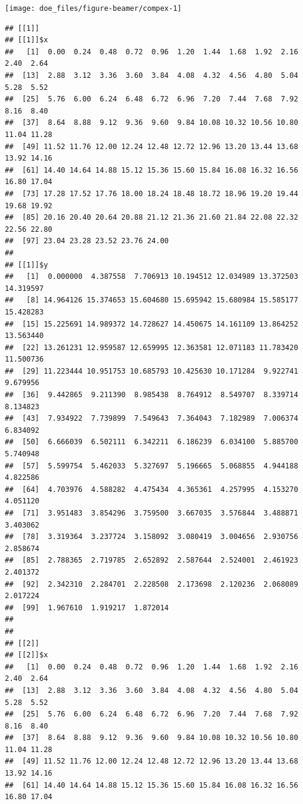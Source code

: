 \documentclass[
  ignorenonframetext,
]{beamer}
\begin{document}
\begin{frame}[fragile]{}
\begin{center}\texttt{[image: doe\_files/figure-beamer/compex-1]} \end{center}

\begin{verbatim}
## [[1]]
## [[1]]$x
##   [1]  0.00  0.24  0.48  0.72  0.96  1.20  1.44  1.68  1.92  2.16  2.40  2.64
##  [13]  2.88  3.12  3.36  3.60  3.84  4.08  4.32  4.56  4.80  5.04  5.28  5.52
##  [25]  5.76  6.00  6.24  6.48  6.72  6.96  7.20  7.44  7.68  7.92  8.16  8.40
##  [37]  8.64  8.88  9.12  9.36  9.60  9.84 10.08 10.32 10.56 10.80 11.04 11.28
##  [49] 11.52 11.76 12.00 12.24 12.48 12.72 12.96 13.20 13.44 13.68 13.92 14.16
##  [61] 14.40 14.64 14.88 15.12 15.36 15.60 15.84 16.08 16.32 16.56 16.80 17.04
##  [73] 17.28 17.52 17.76 18.00 18.24 18.48 18.72 18.96 19.20 19.44 19.68 19.92
##  [85] 20.16 20.40 20.64 20.88 21.12 21.36 21.60 21.84 22.08 22.32 22.56 22.80
##  [97] 23.04 23.28 23.52 23.76 24.00
## 
## [[1]]$y
##   [1]  0.000000  4.387558  7.706913 10.194512 12.034989 13.372503 14.319597
##   [8] 14.964126 15.374653 15.604680 15.695942 15.680984 15.585177 15.428283
##  [15] 15.225691 14.989372 14.728627 14.450675 14.161109 13.864252 13.563440
##  [22] 13.261231 12.959587 12.659995 12.363581 12.071183 11.783420 11.500736
##  [29] 11.223444 10.951753 10.685793 10.425630 10.171284  9.922741  9.679956
##  [36]  9.442865  9.211390  8.985438  8.764912  8.549707  8.339714  8.134823
##  [43]  7.934922  7.739899  7.549643  7.364043  7.182989  7.006374  6.834092
##  [50]  6.666039  6.502111  6.342211  6.186239  6.034100  5.885700  5.740948
##  [57]  5.599754  5.462033  5.327697  5.196665  5.068855  4.944188  4.822586
##  [64]  4.703976  4.588282  4.475434  4.365361  4.257995  4.153270  4.051120
##  [71]  3.951483  3.854296  3.759500  3.667035  3.576844  3.488871  3.403062
##  [78]  3.319364  3.237724  3.158092  3.080419  3.004656  2.930756  2.858674
##  [85]  2.788365  2.719785  2.652892  2.587644  2.524001  2.461923  2.401372
##  [92]  2.342310  2.284701  2.228508  2.173698  2.120236  2.068089  2.017224
##  [99]  1.967610  1.919217  1.872014
## 
## 
## [[2]]
## [[2]]$x
##   [1]  0.00  0.24  0.48  0.72  0.96  1.20  1.44  1.68  1.92  2.16  2.40  2.64
##  [13]  2.88  3.12  3.36  3.60  3.84  4.08  4.32  4.56  4.80  5.04  5.28  5.52
##  [25]  5.76  6.00  6.24  6.48  6.72  6.96  7.20  7.44  7.68  7.92  8.16  8.40
##  [37]  8.64  8.88  9.12  9.36  9.60  9.84 10.08 10.32 10.56 10.80 11.04 11.28
##  [49] 11.52 11.76 12.00 12.24 12.48 12.72 12.96 13.20 13.44 13.68 13.92 14.16
##  [61] 14.40 14.64 14.88 15.12 15.36 15.60 15.84 16.08 16.32 16.56 16.80 17.04

\end{verbatim}
\end{frame}
\end{document}
